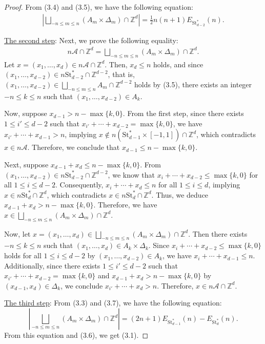 \documentclass[a4paper,reqno,11pt, oneside]{amsart}
\newcommand{\Ac}{\mathcal{A}}
\newcommand{\ZZ}{\mathbb{Z}}
\theoremstyle{definition}
\theoremstyle{remark}
\begin{document}
\begin{proof}
From (3.4) and (3.5), we have the following equation:
\begin{align}
  \left|\bigsqcup_{-n \leq m \leq n}(A_m \times \Delta_m) \cap \ZZ^d \right| = \frac{1}{2}n(n+1)E_{\mathrm{St}_{d-2}^\ast}(n).
\end{align}

\smallskip

\noindent
\underline{The second step}: Next, we prove the following equality:
\begin{align}
  n\Ac \cap \ZZ^d = \bigsqcup_{-n \leq m \leq n}(A_m \times \Delta_m) \cap \ZZ^d.
\end{align}
Let $x = (x_1, \ldots, x_d) \in n\Ac \cap \ZZ^d$. Then, $x_d \leq n$ holds, and since $(x_1, \ldots, x_{d-2}) \in n\mathrm{St}_{d-2}^\ast \cap \ZZ^{d-2}$, that is, $(x_1, \ldots, x_{d-2}) \in \bigsqcup_{-n \leq m \leq n}A_m \cap \ZZ^{d-2}$ holds by (3.5), there exists an integer $-n \leq k \leq n$ such that $(x_1, \ldots, x_{d-2}) \in A_k$. 

Now, suppose $x_{d-1} > n-\max\{k, 0\}$. From the first step, since there exists $1 \leq i' \leq d-2$ such that $x_{i'} + \cdots + x_{d-2} = \max\{k, 0\}$, we have $x_{i'} + \cdots + x_{d-1} > n$, implying $x \notin n(\mathrm{St}_{d-1}^\ast \times [-1, 1]) \cap \ZZ^d$, which contradicts $x \in n\Ac$. Therefore, we conclude that $x_{d-1} \leq n-\max\{k, 0\}$. 

Next, suppose $x_{d-1}+x_d \leq n-\max\{k, 0\}$. From $(x_1, \ldots, x_{d-2}) \in n\mathrm{St}_{d-2}^\ast \cap \ZZ^{d-2}$, we know that $x_{i} + \cdots + x_{d-2} \leq \max\{k, 0\}$ for all $1 \leq i \leq d-2$. Consequently, $x_{i} + \cdots + x_d \leq n$ for all $1 \leq i \leq d$, implying $x \in n\mathrm{St}_d^\ast\cap \ZZ^d$, which contradicts $x \in n\mathrm{St}_d^\ast \cap \ZZ^d$. Thus, we deduce $x_{d-1}+x_d > n-\max\{k, 0\}$.
Therefore, we have $x \in \bigsqcup_{-n \leq m \leq n}(A_m \times \Delta_m) \cap \ZZ^d$.

Now, let $x = (x_1, \ldots, x_d) \in \bigsqcup_{-n \leq m \leq n}(A_m \times \Delta_m) \cap \ZZ^d$. Then there exists $-n \leq k \leq n$ such that $(x_1, \ldots, x_d) \in A_k \times \Delta_k$. Since $x_i + \cdots + x_{d-2} \leq \max\{k, 0\}$ holds for all $1 \leq i \leq d-2$ by $(x_1, \ldots, x_{d-2}) \in A_k$, we have $x_i + \cdots + x_{d-1} \leq n$. 
Additionally, since there exists $1 \leq i' \leq d-2$ such that $x_{i'} + \cdots + x_{d-2} = \max\{k, 0\}$ and $x_{d-1} + x_d > n-\max\{k, 0\}$ by $(x_{d-1}, x_d) \in \Delta_k$, we conclude $x_{i'} + \cdots + x_d > n$. Therefore, $x \in n\Ac \cap \ZZ^d$.

\smallskip

\noindent
\underline{The third step}: From (3.3) and (3.7), we have the following equation:
$$\left| \bigsqcup_{-n \leq m \leq n}(A_m \times \Delta_m) \cap \ZZ^d \right|= (2n+1)E_{\mathrm{St}_{d-1}^\ast}(n) - E_{\mathrm{St}_d^\ast}(n).$$
From this equation and (3.6), we get (3.1).
\end{proof}
\end{document}
